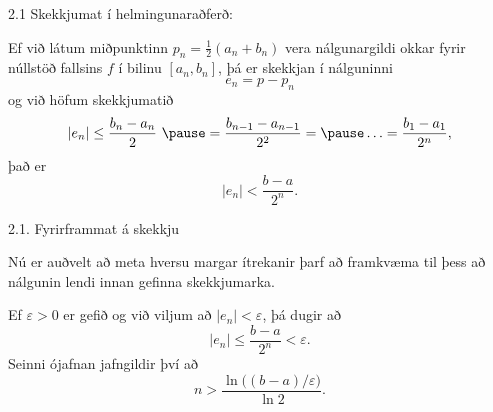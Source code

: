 %
%
\begin{frame}{2.1 Skekkjumat í helmingunaraðferð:} 

Ef við látum miðpunktinn $p_n=\tfrac 12(a_n+b_n)$ vera nálgunargildi
okkar fyrir núllstöð fallsins $f$ í bilinu $[a_n,b_n]$, þá er 
skekkjan í nálguninni
$$
e_n=p-p_n
$$ 
\pause
og við höfum skekkjumatið
$$
|e_n|\leq  \dfrac{b_n - a_n}{2}\ \pause
= \frac{b_{n-1}-a_{n-1}}{2^2} = \pause \ldots = \dfrac{b_1-a_1}{2^{n}},
$$
\pause
það er
$$
|e_n| < \dfrac{b-a}{2^{n}}.
$$
\end{frame}
%
\begin{frame}{2.1. Fyrirframmat á skekkju} 

Nú er auðvelt að meta hversu margar ítrekanir þarf að framkvæma til
þess að nálgunin lendi innan gefinna skekkjumarka.  

\pause
Ef $\varepsilon>0$
er gefið og við viljum að $|e_n|<\varepsilon$, þá dugir að  
\begin{equation*}
	|e_n|\leq \dfrac{b-a}{2^{n}} <\varepsilon.
\end{equation*}\pause
Seinni ójafnan jafngildir því að 
\begin{equation*}
	n>\dfrac{\ln\big((b-a)/\varepsilon\big)}{\ln 2}.
\end{equation*}
\end{frame}



